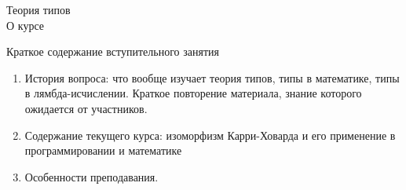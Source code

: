 \documentclass[aspectratio=169]{beamer}
\begin{document}
\newtheorem{dfn}{Определение}[section]
\newtheorem{nte}{Замечание}[section]

\newtheorem{axiom}{Аксиома}[section]
\newtheorem{thm}{Теорема}[section]
\newtheorem{lmm}[theorem]{Лемма}
\newtheorem{statement}{Утверждение}[section]
\newtheorem{oun_paragraph}{Пункт}[section]
\newtheorem{cons}{Следствие}[section]
\newtheorem*{exm}{Пример}

\newcommand{\comb}[1]{\operatorname{\mathcal{#1}}}
\newcommand{\func}[1]{\operatorname{#1}}
\newcommand{\reduction}[1]{{\color{OrangeRed}#1}}
\newcommand{\set}[1]{\left\{#1\right\}}

\def\from#1{\par \parbox{0.7\textwidth}{\par \hfill\raggedleft \it #1}} 

\begin{frame}{}
\begin{center}
{\LARGE Теория типов}\\\vspace{1cm}
\large О курсе
\end{center}
\end{frame}

\begin{frame}{Краткое содержание вступительного занятия}
\begin{enumerate}
\item История вопроса: что вообще изучает теория типов, типы в математике, типы в лямбда-исчислении.
Краткое повторение материала, знание которого ожидается от участников.
\item Содержание текущего курса: изоморфизм Карри-Ховарда и его применение в программировании и математике
\item Особенности преподавания.
\end{enumerate}
\end{frame}
\end{document}
